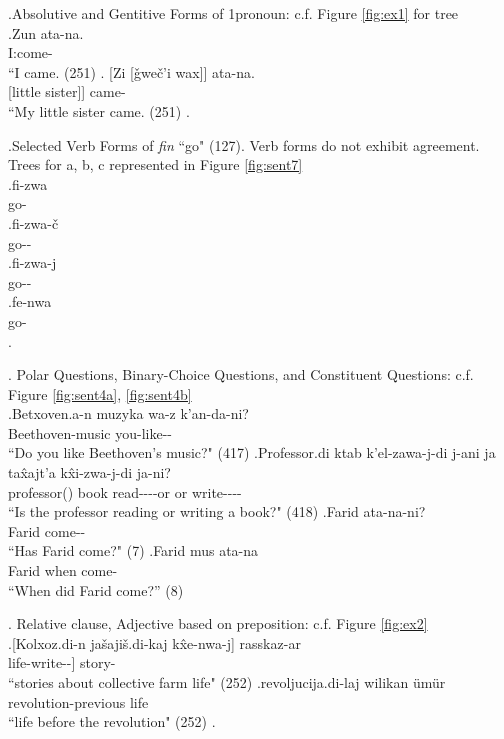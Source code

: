 \ex.\label{sent:ex1}Absolutive and Gentitive Forms of 1\Sg[] pronoun: c.f. Figure \ref{fig:ex1} for tree \\ 
    \ag.Zun ata-na. \\
        I:\Abs[] come-\Aori[] \\
        ``I came. (251)
    \bg. [Zi [\v{g}we\v{c}'i wax]] ata-na. \\
        [I:\Gen[] [little sister]] came-\Aori[] \\
        ``My little sister came. (251)
    \z.

\ex.\label{sent:ex7}Selected Verb Forms of \textit{fin} ``go" (127). Verb forms do not exhibit agreement. Trees for a, b, c represented in Figure \ref{fig:sent7} \\
    \ag.fi-zwa \\
    go-\Impf[] \\
    \bg.fi-zwa-\v{c} \\
    go-\Impf[]-\Neg[] \\
    \cg.fi-zwa-j \\
    go-\Impf[]-\Pst[] \\
    \dg.fe-nwa \\
    go-\Prf[] \\
    \z.

\ex. \label{sent:ex4}Polar Questions, Binary-Choice Questions, and Constituent Questions: c.f. Figure \ref{fig:sent4a}, \ref{fig:sent4b} \\
    \ag.\label{sent:ex4a}Betxoven.a-n muzyka wa-z k'an-da-ni? \\
    Beethoven-\Gen[] music you-\Dat[] like-\Fut[]-\Q[] \\
    ``Do you like Beethoven's music?" (417)
    \bg.\label{sent:ex4b}Professor.di ktab k'el-zawa-j-di j-ani ja ta\^{x}ajt'a k\^{x}i-zwa-j-di ja-ni? \\
    professor(\Erg[]) book read-\Impf[]-\Ptcp[]-\Sbstz[] \Cop[]-\Q[] or or write-\Impf[]-\Ptcp[]-\Sbstz[] \Cop[]-\Q[] \\
    ``Is the professor reading or writing a book?" (418)
    \cg.\label{sent:ex4c}Farid ata-na-ni? \\
    Farid come-\Aori-\Q \\
    ``Has Farid come?" (7)
    \dg.\label{sent:ex4d}Farid mus ata-na \\
    Farid when come-\Aori \\
    ``When did Farid come?'' (8)

\ex. Relative clause, Adjective based on preposition: c.f. Figure \ref{fig:ex2} \\
    \ag.\label{sent:ex2a}[Kolxoz.di-n ja\v{s}aji\v{s}.di-kaj k\^{x}e-nwa-j] rasskaz-ar \\
        [kolkhoz-\Gen[] life-\Sbelc[] write-\Prf[]-\Ptcp[]] story-\Pl[] \\
        ``stories about collective farm life" (252)
    \bg.\label{sent:ex2b}revoljucija.di-laj wilikan \"{u}m\"{u}r \\
        revolution-\Srelc[] previous life \\
        ``life before the revolution" (252)
    \z.
    
